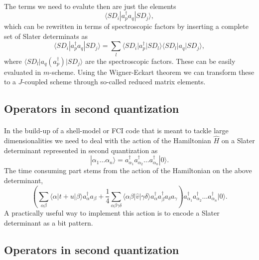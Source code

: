 \documentclass[%
oneside,                 %
final,                   %
10pt]{article}
\begin{document}
\paragraph{}
The terms we need to evalute then are just the elements 
\[
\langle SD_i |a_p^{\dagger} a_q | SD_j \rangle, 
\]
which can be rewritten in terms of spectroscopic factors by inserting a complete set of Slater determinats as
\[
\langle SD_i |a_p^{\dagger} a_q | SD_j \rangle = \sum_{l}\langle SD_i \vert a_p^{\dagger}\vert SD_l\rangle \langle SD_l \vert  a_q \vert SD_j \rangle,
\]
where $\langle SD_l\vert a_q(a_p^{\dagger})\vert SD_j\rangle$ are the spectroscopic factors. These can be easily evaluated in $m$-scheme. Using the Wigner-Eckart theorem we can transform these to a $J$-coupled scheme through so-called reduced matrix elements.



\subsection*{Operators in second quantization}

\paragraph{}
In the build-up of a shell-model or FCI code that is meant to tackle large dimensionalities
we need to deal with the action of the Hamiltonian $\hat{H}$ on a
Slater determinant represented in second quantization as
\[
 |\alpha_1\dots \alpha_n\rangle = a_{\alpha_1}^{\dagger} a_{\alpha_2}^{\dagger} \dots a_{\alpha_n}^{\dagger} |0\rangle.
\]
The time consuming part stems from the action of the Hamiltonian
on the above determinant,
\[
\left(\sum_{\alpha\beta} \langle \alpha|t+u|\beta\rangle a_\alpha^{\dagger} a_\beta + \frac{1}{4} \sum_{\alpha\beta\gamma\delta}
                \langle \alpha \beta|\hat{v}|\gamma \delta\rangle a_\alpha^{\dagger} a_\beta^{\dagger} a_\delta a_\gamma\right)a_{\alpha_1}^{\dagger} a_{\alpha_2}^{\dagger} \dots a_{\alpha_n}^{\dagger} |0\rangle.
\]
A practically useful way to implement this action is to encode a Slater determinant as a bit pattern.



\subsection*{Operators in second quantization}
\end{document}
